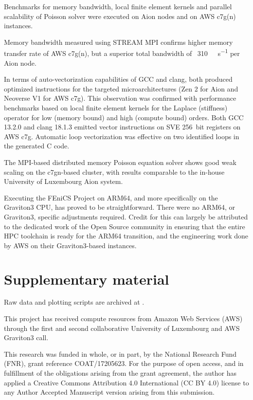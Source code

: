 Benchmarks for memory bandwidth, local finite element kernels and parallel
scalability of Poisson solver were executed on Aion nodes and on AWS c7g(n)
instances.

Memory bandwidth measured using STREAM MPI confirms higher memory transfer rate
of AWS c7g(n), but a superior total bandwidth of ~\SI{310}{\giga\byte\per\second}
per Aion node.

In terms of auto-vectorization capabilities of GCC and clang, both produced
optimized instructions for the targeted microarchitectures (Zen 2 for Aion and
Neoverse V1 for AWS c7g). This observation was confirmed with performance
benchmarks based on local finite element kernels for the Laplace (stiffness)
operator for low (memory bound) and high (compute bound) orders. Both
GCC 13.2.0 and clang 18.1.3 emitted vector instructions on SVE \SI{256}{bit}
registers on AWS c7g. Automatic loop vectorization was effective on two identified
loops in the generated C code.

The MPI-based distributed memory Poisson equation solver shows good weak
scaling on the c7gn-based cluster, with results comparable to the in-house
University of Luxembourg Aion system.

Executing the FEniCS Project on ARM64, and more specifically on the Graviton3
CPU, has proved to be straightforward. There were no ARM64, or Graviton3,
specific adjustments required. Credit for this can largely be attributed to the
dedicated work of the Open Source community in ensuring that the entire HPC
toolchain is ready for the ARM64 transition, and the engineering work done by
AWS on their Graviton3-based instances.

\section*{Supplementary material}
Raw data and plotting scripts are archived at \citep{}.

\begin{acknowledgement}
This project has received compute resources from Amazon Web Services (AWS)
through the first and second collaborative University of Luxembourg and
AWS Graviton3 call.

This research was funded in whole, or in part, by the National Research Fund
(FNR), grant reference COAT/17205623. For the purpose of open access, and in
fulfillment of the obligations arising from the grant agreement, the author has
applied a Creative Commons Attribution 4.0 International (CC BY 4.0) license to
any Author Accepted Manuscript version arising from this submission.
\end{acknowledgement}





